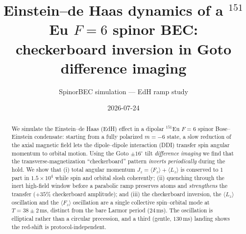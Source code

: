\documentclass[11pt]{article}
\title{Einstein--de Haas dynamics of a $^{151}$Eu $F{=}6$ spinor BEC:\\
checkerboard inversion in Goto difference imaging}
\author{SpinorBEC simulation --- EdH ramp study}
\date{2026-07-24}
\newcommand{\Fz}{\langle F_z\rangle}
\newcommand{\Lz}{\langle L_z\rangle}
\newcommand{\Jz}{J_z}
\newcommand{\ms}{\,\mathrm{ms}}
\begin{document}
\maketitle

\begin{abstract}
We simulate the Einstein--de Haas (EdH) effect in a dipolar $^{151}$Eu $F{=}6$
spinor Bose--Einstein condensate: starting from a fully polarized $m{=}{-}6$ state,
a slow reduction of the axial magnetic field lets the dipole--dipole interaction
(DDI) transfer spin angular momentum to orbital motion. Using the Goto $\pm16^\circ$
tilt \emph{difference imaging} we find that the transverse-magnetization
``checkerboard'' pattern \emph{inverts periodically} during the hold. We show that
(i) total angular momentum $\Jz=\Fz+\Lz$ is conserved to $1$ part in $1.5\times10^4$
while spin and orbital slosh coherently; (ii) quenching through the inert
high-field window before a parabolic ramp preserves atoms and \emph{strengthens}
the transfer ($+35\%$ checkerboard amplitude); and (iii) the checkerboard inversion,
the $\Lz$ oscillation and the $\Fz$ oscillation are a single collective spin--orbital
mode at $T=38\pm2\ms$, distinct from the bare Larmor period ($24\ms$). The
oscillation is elliptical rather than a circular precession, and a third (gentle,
$130\ms$) landing shows the red-shift is protocol-independent.
\end{abstract}
\end{document}
